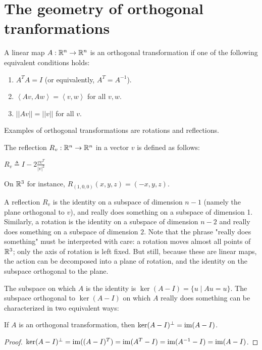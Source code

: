 \section{The geometry of orthogonal tranformations}

\newcommand{\inner}[1]{\left<#1\right>}
\newcommand{\len}[1]{||#1||}

A linear map $A : \mathbb{R}^n \to \mathbb{R}^n$ is an orthogonal transformation if one of the following equivalent conditions holds:
\begin{enumerate}
  \item $A^T A = I$ (or equivalently, $A^T = A^{-1}$).
  \item $\inner{Av,Aw} = \inner{v,w}$ for all $v,w$.
  \item $\len{Av} = \len{v}$ for all $v$.
\end{enumerate}

Examples of orthogonal transformations are rotations and reflections.

The reflection $R_v : \mathbb{R}^n \to \mathbb{R}^n$ in a vector $v$ is defined as follows:
\begin{definition}
  $R_v \triangleq{} I - 2\frac{v v^T}{|v|^2}$
\end{definition}
On $\mathbb{R}^3$ for instance, $R_{(1,0,0)}(x,y,z) = (-x,y,z)$.

A reflection $R_v$ is the identity on a subspace of dimension $n - 1$ (namely the plane orthogonal to $v$), and really does something on a subspace of dimension 1.
Similarly, a rotation is the identity on a subspace of dimension $n - 2$ and really does something on a subspace of dimension $2$.
Note that the phrase "really does something" must be interpreted with care: a rotation moves almost all points of $\mathbb{R}^3$; only the axis of rotation is left fixed. But still, because these are linear maps, the action can be decomposed into a plane of rotation, and the identity on the subspace orthogonal to the plane.

The subspace on which $A$ is the identity is $\ker(A - I) = \{ u \mid A u = u \}$.
The subspace orthogonal to $\ker(A - I)$ on which $A$ really does something can be characterized in two equivalent ways:

\begin{lemma}
  \label{lem:imker}
  If $A$ is an orthogonal transformation, then $\ker(A - I)^\perp = \operatorname{im}(A - I)$.
\end{lemma}
\begin{proof}
  $\ker(A - I)^\perp = \operatorname{im}((A - I)^T) = \operatorname{im}(A^T - I) = \operatorname{im}(A^{-1} - I) = \operatorname{im}(A - I)$.
\end{proof}

